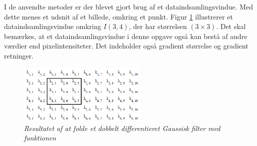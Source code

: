 \noindent
I de anvendte metoder er der blevet gjort brug af et dataindsamlingsvindue. Med dette menes et udsnit af et billede, omkring et punkt. Figur \ref{fig:dataindvin} illustrerer et dataindsamlingsvindue omkring $I(3,4)$, der har størrelsen $(3 \times 3)$. Det skal bemærkes, at et dataindsamlingsvindue i denne opgave også kan bestå af andre værdier end pixelintensiteter. Det indeholder også gradient størrelse og gradient retninger.
\begin{figure}[H]
    \centering
    \includegraphics[width=0.55\textwidth]{fig/dataindsamlingsvinduepic.png}
    \vspace{-1em}   
    \begin{center}
    \caption{{\footnotesize \textit{
     Resultatet af at folde et dobbelt differentieret Gaussisk filter med funktionen}}}
    \label{fig:dataindvin}
     \end{center}
    \vspace{-2.5em}  
  \end{figure}
\noindent